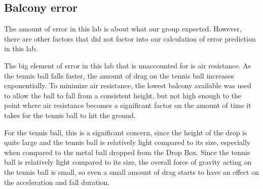 \documentclass[12pt]{article}
\begin{document}
\subsection{Balcony error}
\label{sec:org7e9105d}

The amount of error in this lab is about what our group expected. However, there are other factors that did not factor into our calculation of error prediction in this lab.

The big element of error in this lab that is unaccounted for is air resistance. As the tennis ball falls faster, the amount of drag on the tennis ball increases exponentially. To minimize air resistance, the lowest balcony available was used to allow the ball to fall from a consistent height, but not high enough to the point where air resistance becomes a significant factor on the amount of time it takes for the tennis ball to hit the ground.

For the tennis ball, this is a significant concern, since the height of the drop is quite large and the tennis ball is relatively light compared to its size, especially when compared to the metal ball dropped from the Drop Box. Since the tennis ball is relatively light compared to its size, the overall force of gravity acting on the tennis ball is small, so even a small amount of drag starts to have an effect on the acceleration and fall duration.
\end{document}
